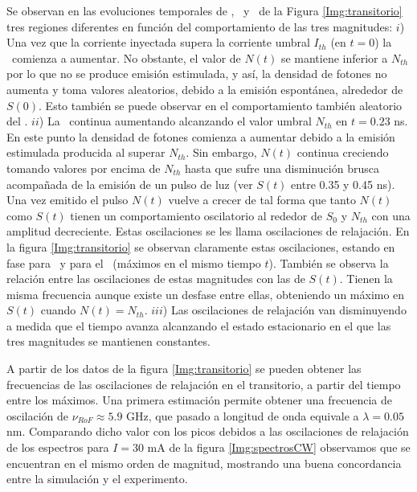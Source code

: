 		Se observan en las evoluciones temporales de \n, \s\ y \chirp\ de la Figura \ref{Img:transitorio} tres regiones diferentes en función del comportamiento de las tres magnitudes: $i$) Una vez que la corriente inyectada supera la corriente umbral $I_{th}$ (en $t=0$) la \n\ comienza a aumentar. No obstante, el valor de $N(t)$ se mantiene inferior a $N_{th}$ por lo que no se produce emisión estimulada, y así, la densidad de fotones no aumenta y toma valores aleatorios, debido a la emisión espontánea, alrededor de $S(0)$. Esto también se puede observar en el comportamiento también aleatorio del \chirp. $ii$) La \n\ continua aumentando alcanzando el valor umbral $N_{th}$ en $t = 0.23$ ns. En este punto la densidad de fotones comienza a aumentar debido a la emisión estimulada producida al superar $N_{th}$. Sin embargo, $N(t)$ continua creciendo tomando valores por encima de $N_{th}$ hasta que sufre una disminución brusca acompañada de la emisión de un pulso de luz (ver $S(t)$ entre 0.35 y 0.45 ns). Una vez emitido el pulso $N(t)$ vuelve a crecer de tal forma que tanto $N(t)$ como $S(t)$ tienen un comportamiento oscilatorio al rededor de $S_0$ y $N_{th}$ con una amplitud decreciente. Estas oscilaciones se les llama oscilaciones de relajación. En la figura \ref{Img:transitorio} se observan claramente estas oscilaciones, estando en fase para \n\ y para el \chirp\ (máximos en el mismo tiempo $t$). También se observa la relación entre las oscilaciones de estas magnitudes con las de $S(t)$. Tienen la misma frecuencia aunque existe un desfase entre ellas, obteniendo un máximo en $S(t)$ cuando $N(t) = N_{th}$. $iii$) Las oscilaciones de relajación van disminuyendo a medida que el tiempo avanza alcanzando el estado estacionario en el que las tres magnitudes se mantienen constantes.

		A partir de los datos de la figura \ref{Img:transitorio} se pueden obtener las frecuencias de las oscilaciones de relajación en el transitorio, a partir del tiempo entre los máximos. Una primera estimación permite obtener una frecuencia de oscilación de $\nu_{RoF} \approx 5.9$ GHz, que pasado a longitud de onda equivale a $\lambda = 0.05$ nm. Comparando dicho valor con los picos debidos a las oscilaciones de relajación de los espectros para $I = 30$ mA de la figura \ref{Img:spectrosCW} observamos que se encuentran en el mismo orden de magnitud, mostrando una buena concordancia entre la simulación y el experimento.
